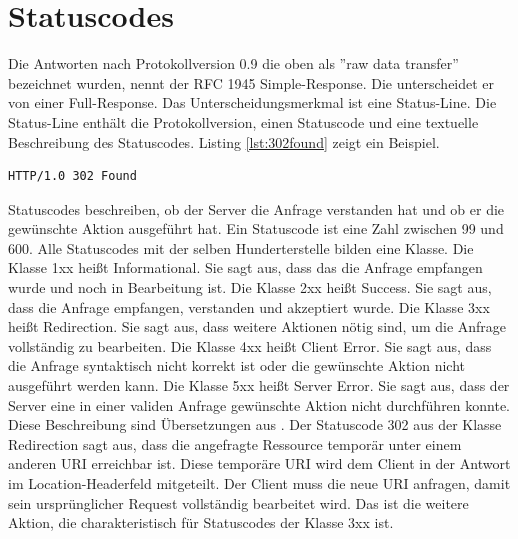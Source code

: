 \documentclass{llncs}
\begin{document}
\section{Statuscodes}
Die Antworten nach Protokollversion 0.9 die oben als ''raw data transfer'' bezeichnet wurden, nennt der RFC 1945 Simple-Response. Die unterscheidet er von einer Full-Response. Das Unterscheidungsmerkmal ist eine Status-Line. Die Status-Line enthält die Protokollversion, einen Statuscode und eine textuelle Beschreibung des Statuscodes. Listing \ref{lst:302found} zeigt ein Beispiel.

\begin{lstlisting}[caption={Statuscode 302},label={lst:302found}]
HTTP/1.0 302 Found
\end{lstlisting}

Statuscodes beschreiben, ob der Server die Anfrage verstanden hat und ob er die gewünschte Aktion ausgeführt hat. Ein Statuscode ist eine Zahl zwischen 99 und 600. Alle Statuscodes mit der selben Hunderterstelle bilden eine Klasse.\newline
Die Klasse 1xx heißt Informational. Sie sagt aus, dass das die Anfrage empfangen wurde und noch in Bearbeitung ist.\newline
Die Klasse 2xx heißt Success. Sie sagt aus, dass die Anfrage empfangen, verstanden und akzeptiert wurde.\newline
Die Klasse 3xx heißt Redirection. Sie sagt aus, dass weitere Aktionen nötig sind, um die Anfrage vollständig zu bearbeiten.\newline
Die Klasse 4xx heißt Client Error. Sie sagt aus, dass die Anfrage syntaktisch nicht korrekt ist oder die gewünschte Aktion nicht ausgeführt werden kann.\newline
Die Klasse 5xx heißt Server Error. Sie sagt aus, dass der Server eine in einer validen Anfrage gewünschte Aktion nicht durchführen konnte. \newline
Diese Beschreibung sind Übersetzungen aus \cite{Fielding1999}. \newline
Der Statuscode 302 aus der Klasse Redirection sagt aus, dass die angefragte Ressource temporär unter einem anderen URI erreichbar ist. Diese temporäre URI wird dem Client in der Antwort im Location-Headerfeld mitgeteilt. Der Client muss die neue URI anfragen, damit sein ursprünglicher Request vollständig bearbeitet wird. Das ist die weitere Aktion, die charakteristisch für Statuscodes der Klasse 3xx ist. 
   
\end{document}
